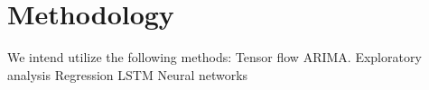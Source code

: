 \section{Methodology}

We intend utilize the following methods:  
Tensor flow 
ARIMA. 
Exploratory analysis 
Regression 
LSTM 
Neural networks 